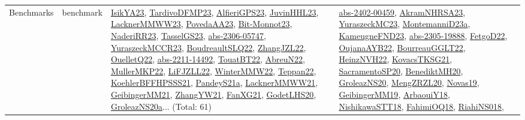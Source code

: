 {\begin{longtable}{lp{3cm}>{\raggedright}p{6cm}>{\raggedright}p{6cm}p{8cm}}
Benchmarks & benchmark & \href{articles/IsikYA23.pdf}{IsikYA23}\cite{IsikYA23}, \href{papers/TardivoDFMP23.pdf}{TardivoDFMP23}\cite{TardivoDFMP23}, \href{articles/AlfieriGPS23.pdf}{AlfieriGPS23}\cite{AlfieriGPS23}, \href{papers/JuvinHHL23.pdf}{JuvinHHL23}\cite{JuvinHHL23}, \href{articles/LacknerMMWW23.pdf}{LacknerMMWW23}\cite{LacknerMMWW23}, \href{papers/PovedaAA23.pdf}{PovedaAA23}\cite{PovedaAA23}, \href{papers/Bit-Monnot23.pdf}{Bit-Monnot23}\cite{Bit-Monnot23}, \href{articles/NaderiRR23.pdf}{NaderiRR23}\cite{NaderiRR23}, \href{papers/TasselGS23.pdf}{TasselGS23}\cite{TasselGS23}, \href{articles/abs-2306-05747.pdf}{abs-2306-05747}\cite{abs-2306-05747}, \href{articles/YuraszeckMCCR23.pdf}{YuraszeckMCCR23}\cite{YuraszeckMCCR23}, \href{papers/BoudreaultSLQ22.pdf}{BoudreaultSLQ22}\cite{BoudreaultSLQ22}, \href{papers/ZhangJZL22.pdf}{ZhangJZL22}\cite{ZhangJZL22}, \href{papers/OuelletQ22.pdf}{OuelletQ22}\cite{OuelletQ22}, \href{articles/abs-2211-14492.pdf}{abs-2211-14492}\cite{abs-2211-14492}, \href{papers/TouatBT22.pdf}{TouatBT22}\cite{TouatBT22}, \href{articles/AbreuN22.pdf}{AbreuN22}\cite{AbreuN22}, \href{articles/MullerMKP22.pdf}{MullerMKP22}\cite{MullerMKP22}, \href{papers/LiFJZLL22.pdf}{LiFJZLL22}\cite{LiFJZLL22}, \href{papers/WinterMMW22.pdf}{WinterMMW22}\cite{WinterMMW22}, \href{papers/Teppan22.pdf}{Teppan22}\cite{Teppan22}, \href{articles/KoehlerBFFHPSSS21.pdf}{KoehlerBFFHPSSS21}\cite{KoehlerBFFHPSSS21}, \href{articles/PandeyS21a.pdf}{PandeyS21a}\cite{PandeyS21a}, \href{papers/LacknerMMWW21.pdf}{LacknerMMWW21}\cite{LacknerMMWW21}, \href{papers/GeibingerMM21.pdf}{GeibingerMM21}\cite{GeibingerMM21}, \href{articles/ZhangYW21.pdf}{ZhangYW21}\cite{ZhangYW21}, \href{articles/FanXG21.pdf}{FanXG21}\cite{FanXG21}, \href{papers/GodetLHS20.pdf}{GodetLHS20}\cite{GodetLHS20}, \href{papers/GroleazNS20a.pdf}{GroleazNS20a}\cite{GroleazNS20a}... (Total: 61) & \href{articles/abs-2402-00459.pdf}{abs-2402-00459}\cite{abs-2402-00459}, \href{articles/AkramNHRSA23.pdf}{AkramNHRSA23}\cite{AkramNHRSA23}, \href{papers/YuraszeckMC23.pdf}{YuraszeckMC23}\cite{YuraszeckMC23}, \href{articles/MontemanniD23a.pdf}{MontemanniD23a}\cite{MontemanniD23a}, \href{papers/KameugneFND23.pdf}{KameugneFND23}\cite{KameugneFND23}, \href{articles/abs-2305-19888.pdf}{abs-2305-19888}\cite{abs-2305-19888}, \href{articles/FetgoD22.pdf}{FetgoD22}\cite{FetgoD22}, \href{papers/OujanaAYB22.pdf}{OujanaAYB22}\cite{OujanaAYB22}, \href{articles/BourreauGGLT22.pdf}{BourreauGGLT22}\cite{BourreauGGLT22}, \href{articles/HeinzNVH22.pdf}{HeinzNVH22}\cite{HeinzNVH22}, \href{papers/KovacsTKSG21.pdf}{KovacsTKSG21}\cite{KovacsTKSG21}, \href{articles/SacramentoSP20.pdf}{SacramentoSP20}\cite{SacramentoSP20}, \href{articles/BenediktMH20.pdf}{BenediktMH20}\cite{BenediktMH20}, \href{papers/GroleazNS20.pdf}{GroleazNS20}\cite{GroleazNS20}, \href{articles/MengZRZL20.pdf}{MengZRZL20}\cite{MengZRZL20}, \href{articles/Novas19.pdf}{Novas19}\cite{Novas19}, \href{papers/GeibingerMM19.pdf}{GeibingerMM19}\cite{GeibingerMM19}, \href{papers/ArbaouiY18.pdf}{ArbaouiY18}\cite{ArbaouiY18}, \href{papers/NishikawaSTT18.pdf}{NishikawaSTT18}\cite{NishikawaSTT18}, \href{articles/FahimiOQ18.pdf}{FahimiOQ18}\cite{FahimiOQ18}, \href{papers/RiahiNS018.pdf}{RiahiNS018}\cite{RiahiNS018}, 
\end{longtable}}
